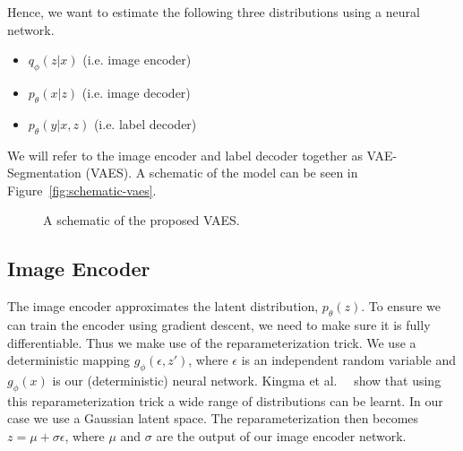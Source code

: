 Hence, we want to estimate the following three distributions using a neural network.
\begin{itemize}
    \item $q_\phi(z|x)$ (i.e. image encoder)
    \item $p_\theta(x|z)$ (i.e. image decoder)
    \item $p_\theta(y|x, z)$ (i.e. label decoder)
\end{itemize}
We will refer to the image encoder and label decoder together as VAE-Segmentation (VAES). A schematic of the model can be seen in Figure~\ref{fig:schematic-vaes}.

\begin{figure}[h]
    \centering
    \hphantom{space}
    \caption{A schematic of the proposed VAES.}
\end{figure}

\subsection{Image Encoder}
The image encoder approximates the latent distribution, $p_\theta(z)$. To ensure we can train the encoder using gradient descent, we need to make sure it is fully differentiable. Thus we make use of the reparameterization trick. We use a deterministic mapping $g_\phi(\epsilon, z')$, where $\epsilon$ is an independent random variable and $g_\phi(x)$ is our (deterministic) neural network. Kingma et al.~~\cite{kingma2014autoencodingvariationalbayes} show that using this reparameterization trick a wide range of distributions can be learnt. In our case we use a Gaussian latent space. The reparameterization then becomes $z = \mu + \sigma \epsilon$, where $\mu$ and $\sigma$ are the output of our image encoder network.

